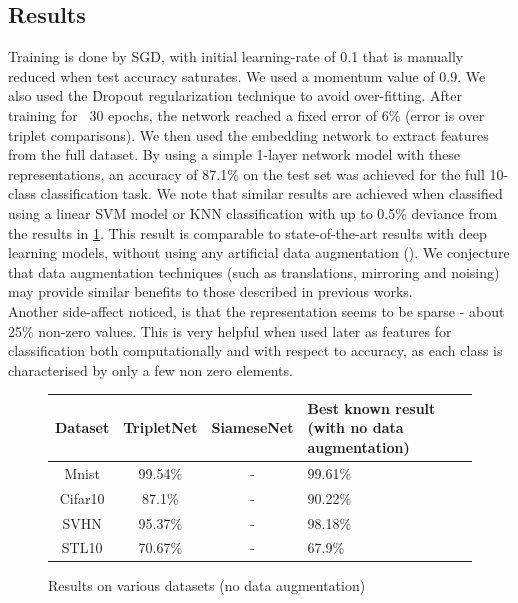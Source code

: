 \documentclass{article} %
\begin{document}
\subsection{Results}
Training is done by SGD, with initial learning-rate of 0.1 that is manually reduced when test accuracy saturates. We used a momentum value of 0.9. We also used the Dropout regularization technique to avoid over-fitting.
After training for ~30 epochs, the network reached a fixed error of 6\% (error is over triplet comparisons). We then used the embedding network to extract features from the full dataset. By using a simple 1-layer network model with these representations, an accuracy of 87.1\% on the test set was achieved for the full 10-class classification task. We note that similar results are achieved when classified using a linear SVM model or KNN classification with up to 0.5\% deviance from the results in \ref{results}.
This result is comparable to state-of-the-art results with deep learning models, without using any artificial data augmentation (\citet{zeiler2013stochastic,goodfellow2013maxout,LinCY13}). We conjecture that data augmentation techniques (such as translations, mirroring and noising) may provide similar benefits to those described in previous works.\\
Another side-affect noticed, is that the representation seems to be sparse - about 25\% non-zero values. This is very helpful when used later as features for classification both computationally and with respect to accuracy, as each class is characterised by only a few non zero elements.
\begin{figure}[h]

    \begin{tabular}{ | c | c | c | p{8cm} |}
    \hline
    Dataset & TripletNet   & SiameseNet  & Best known result (with no data augmentation)       \\ \hline
    Mnist & 99.54\% & -& 99.61\% \citet{mairal2014convolutional,lee2014deeply}  \\ \hline
    Cifar10 & 87.1\% & - & 90.22\% \citet{lee2014deeply}  \\ \hline
    SVHN &  95.37\% & -& 98.18\% \citet{lee2014deeply} \\ \hline
    STL10& 70.67\%& - & 67.9\% \citet{lin2014stable}\\ \hline
    \end{tabular}
     \caption{Results on various datasets (no data augmentation)}\label{results}
     \end{figure}
\end{document}

